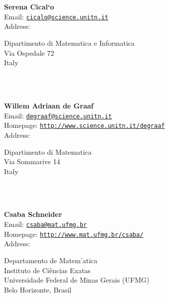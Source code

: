 \documentclass[a4paper,11pt]{report}
\begin{document}
\begin{titlepage}
\mbox{}\\
{\mbox{}\\
\small \noindent \textbf{ Serena Cical{\a`o}\\
   }  Email: \href{mailto://cicalo@science.unitn.it} {\texttt{cicalo@science.unitn.it}}\\
  Address: \begin{minipage}[t]{8cm}\noindent
 Dipartimento di Matematica e Informatica\\
 Via Ospedale 72\\
 Italy\\
 \end{minipage}
}\\
{\mbox{}\\
\small \noindent \textbf{ Willem Adriaan de Graaf\\
    }  Email: \href{mailto://degraaf@science.unitn.it} {\texttt{degraaf@science.unitn.it}}\\
  Homepage: \href{http://www.science.unitn.it/~degraaf} {\texttt{http://www.science.unitn.it/\texttt{}degraaf}}\\
  Address: \begin{minipage}[t]{8cm}\noindent
 Dipartimento di Matematica\\
 Via Sommarive 14\\
 Italy\\
 \end{minipage}
}\\
{\mbox{}\\
\small \noindent \textbf{ Csaba Schneider\\
    }  Email: \href{mailto://csaba@mat.ufmg.br} {\texttt{csaba@mat.ufmg.br}}\\
  Homepage: \href{http://www.mat.ufmg.br/~csaba/} {\texttt{http://www.mat.ufmg.br/\texttt{}csaba/}}\\
  Address: \begin{minipage}[t]{8cm}\noindent
 Departamento de Matem{\a'a}tica\\
 Instituto de Ci{\^e}ncias Exatas\\
 Universidade Federal de Minas Gerais (UFMG)\\
 Belo Horizonte, Brasil\\
 \end{minipage}
}\\
\end{titlepage}
\end{document}
